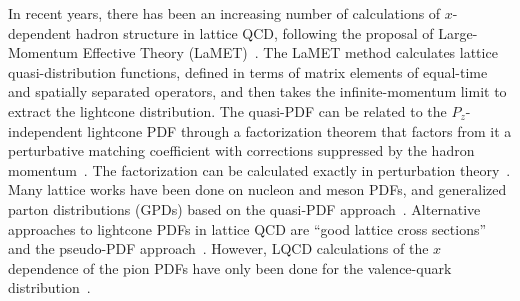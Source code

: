 In recent years, there has been an increasing number of calculations of $x$-dependent hadron structure in lattice QCD, following the proposal of Large-Momentum Effective Theory (LaMET)~\cite{Ji:2013dva,Ji:2014gla,Ji:2017rah}.
The LaMET method calculates lattice quasi-distribution functions, defined in terms of matrix elements of equal-time and spatially separated operators, and then takes the infinite-momentum limit to extract the lightcone distribution.
The quasi-PDF can be related to the $P_z$-independent lightcone PDF through a factorization theorem that factors from it a perturbative matching coefficient with corrections suppressed by the hadron momentum~\cite{Ji:2014gla}.
The factorization can be calculated exactly in perturbation theory~\cite{Ma:2017pxb,Liu:2019urm}.
Many lattice works have been done on nucleon and meson PDFs, and generalized parton distributions (GPDs) based on the quasi-PDF approach~\cite{Lin:2013yra,Lin:2014zya,Chen:2016utp,Lin:2017ani,Alexandrou:2015rja,Alexandrou:2016jqi,Alexandrou:2017huk,Chen:2017mzz,Alexandrou:2018pbm,Chen:2018xof,Chen:2018fwa,Alexandrou:2018eet,Lin:2018qky,Fan:2018dxu,Liu:2018hxv,Wang:2019tgg,Lin:2019ocg,Chen:2019lcm,Lin:2020reh,Chai:2020nxw,Bhattacharya:2020cen,Lin:2020ssv,Zhang:2020dkn,Li:2020xml,Fan:2020nzz,Gao:2020ito,Lin:2020fsj,Zhang:2020rsx,Alexandrou:2020qtt,Alexandrou:2020zbe,Lin:2020rxa,Gao:2021hxl,Lin:2020rut}.
Alternative approaches to lightcone PDFs in lattice QCD are ``good lattice cross sections''~\cite{Ma:2017pxb,Bali:2017gfr,Bali:2018spj,Sufian:2019bol,Sufian:2020vzb} and the pseudo-PDF approach~\cite{Orginos:2017kos,Karpie:2017bzm,Karpie:2018zaz,Karpie:2019eiq,Joo:2019jct,Joo:2019bzr,Radyushkin:2018cvn,Zhang:2018ggy,Izubuchi:2018srq,Joo:2020spy,Bhat:2020ktg,Fan:2020cpa,Sufian:2020wcv,Karthik:2021qwz}.
However, LQCD calculations of the $x$ dependence of the pion PDFs have only been done for the valence-quark distribution~\cite{Chen:2018fwa,Sufian:2019bol,Izubuchi:2019lyk,Joo:2019bzr,Sufian:2020vzb,Shugert:2020tgq,Gao:2020ito}.

